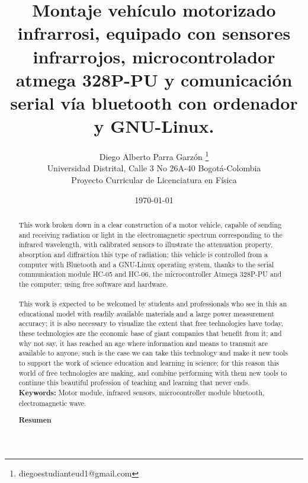 \documentclass[12]{article}
\title{\bf{Montaje vehículo motorizado infrarrosi, equipado con sensores infrarrojos, microcontrolador atmega 328P-PU y comunicación serial vía bluetooth con ordenador y GNU-Linux.}}
\author{Diego Alberto Parra Garzón \footnote{diegoestudianteud1@gmail.com} \\ Universidad Distrital, Calle 3 No 26A-40 Bogotá-Colombia \\    Proyecto Curricular de Licenciatura en Física }
\date{\today}
\def\tablename{Tabla}%
\begin{document}
\renewcommand{\tablename}{Tabla}
\maketitle
\vspace{-0.8cm}

\begin{abstract}
This work broken down in a clear construction of a motor vehicle, capable of sending and receiving radiation or light in the electromagnetic spectrum corresponding to the infrared wavelength, with calibrated sensors to illustrate the attenuation property, absorption and diffraction this type of radiation; this vehicle is controlled from a computer with Bluetooth and a GNU-Linux operating system, thanks to the serial communication module HC-05 and HC-06, the microcontroller Atmega 328P-PU and the computer; using free software and hardware.\\ \\
This work is expected to be welcomed by students and professionals who see in this an educational model with readily available materials and a large power measurement accuracy; it is also necessary to visualize the extent that free technologies have today, these technologies are the economic base of giant companies that benefit from it; and why not say, it has reached an age where information and means to transmit are available to anyone, such is the case we can take this technology and make it new tools to support the work of science education and learning in science; for this reason this world of free technologies are making, and combine performing with them new tools to continue this beautiful profession of teaching and learning that never ends.\\ 
{\bf{Keywords:}} Motor module, infrared sensors, microcontroller module bluetooth, electromagnetic wave.


\begin{center}
{\bf{Resumen}} 
\end{center}


\end{abstract}
\end{document}
